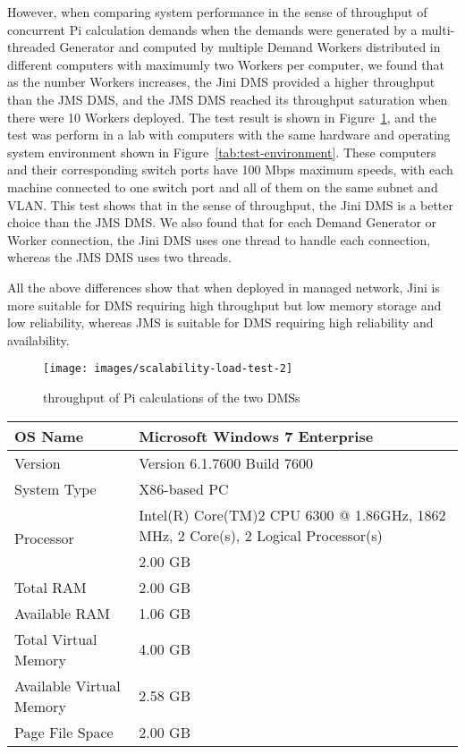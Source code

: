 \documentclass{easychair}
\newcommand{\xf}[1]{Figure~\ref{#1}}
\newcommand{\jini}{{Jini\index{Jini}}}
\newcommand{\jms}{{JMS\index{JMS}}}
\begin{document}
	However, when comparing system performance in the sense of throughput of concurrent Pi
	calculation demands when the demands were generated by a multi-threaded Generator and computed
	by multiple Demand Workers distributed in different computers with maximumly two Workers
	per computer, we found that as the number Workers increases, the {\jini} DMS provided a higher throughput than
	the {\jms} DMS, and the {\jms} DMS reached its throughput saturation when there were 10 Workers deployed.
	The test result is shown in \xf{fig:scalability-load-test-2}, and the test was perform in a lab
	with computers with the same hardware and operating system environment shown in \xf{tab:test-environment}.
	These computers and their corresponding switch ports have 100 Mbps maximum speeds, 
	with each machine connected to one switch port and all of them on the same subnet and VLAN.
	This test shows that in the sense of throughput, the {\jini} DMS is a better choice than the {\jms} DMS.
	We also found that for each Demand Generator or Worker connection, the {\jini} DMS uses one thread
	to handle each connection, whereas the {\jms} DMS uses two threads. 
	
	All the above differences show that when deployed in managed network, {\jini} is more suitable for DMS 
	requiring high throughput but low memory storage and low reliability, whereas {\jms} is suitable for DMS 
	requiring high reliability and availability.
	
	\begin{figure}[htpb!]
	\centering
\texttt{[image: images/scalability-load-test-2]}
	\caption{throughput of Pi calculations of the two DMSs}
	\label{fig:scalability-load-test-2}
	\end{figure}
	
	\begin{table*}[htbp]
		\centering
		\caption{Hardware and operating system environment}
		\label{tab:test-environment}
		\begin{tabular}{ | l | p{8cm} | }
\hline
		OS Name                    & Microsoft Windows 7 Enterprise \\ \hline
		Version                    & Version	6.1.7600 Build 7600 \\ \hline
		System Type                & X86-based PC \\ \hline
		\multirow{2}{*}{Processor} & Intel(R) Core(TM)2 CPU 6300 @ 1.86GHz, 1862 MHz, 2 Core(s), 2 Logical Processor(s) \\ \hline
		Installed RAM	             & 2.00 GB \\ \hline
		Total RAM	                 & 2.00 GB \\ \hline
		Available RAM	             & 1.06 GB \\ \hline
		Total Virtual Memory       & 4.00 GB \\ \hline
		Available Virtual Memory   & 2.58 GB \\ \hline
		Page File Space	           & 2.00 GB \\ \hline
  	\end{tabular}
	\end{table*}
	
\end{document}
